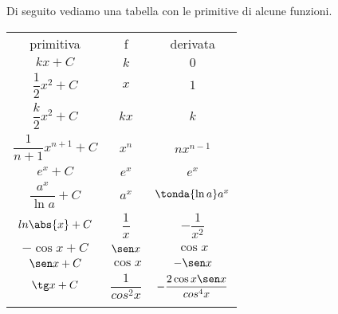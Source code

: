 Di seguito vediamo una tabella con le primitive di alcune funzioni.

{%
\newcommand{\mc}[3]{\multicolumn{#1}{#2}{#3}}
\begin{center}
\begin{tabular}{ccc}
primitiva & f & derivata\\
\(k x +C\) & \(k\) & \(0\)\\
\(\dfrac{1}{2}x^2 +C\) & \(x\) & \(1\)\\
\(\dfrac{k}{2}x^2 +C\) & \(kx\) & \(k\)\\
\(\dfrac{1}{n+1}x^{n+1} +C\) & \(x^n\) & \(nx^{n-1}\)\\
\(e^x +C\) & \(e^x\) & \(e^x\)\\
\(\dfrac{a^x}{\ln{a}} +C\) & \(a^x\) & \(\tonda{\ln{a}} a^x\)\\
\(ln \abs{x} +C\) & \(\dfrac{1}{x}\) & \(-\dfrac{1}{x^2}\)\\
\(-\cos x +C\) & \(\sen x\) & \(\cos x\)\\
\(\sen x +C\) & \(\cos x\) & \(-\sen x\)\\
\(\tg x +C\) & \(\dfrac{1}{cos^2 x}\) & 
    \(-\dfrac{2 \cos x \sen x}{cos^4 x}\)\\
\(\) & \(\) & \(\)\\
\end{tabular}
\end{center}
}%


\begin{esempio}
 
\end{esempio}


